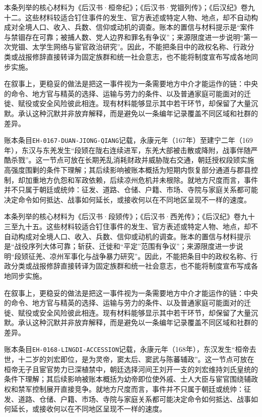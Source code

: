本条列举的核心材料为《后汉书·桓帝纪》；《后汉书·党锢列传》；《后汉纪》卷九十二。这些材料较适合钉住事件的发生、官方表述或特定人物、地点，却不自动构成对全境人口、收入、兵数、信仰或动机的调查。账本的置信与材料提示是“案件与禁锢存在可靠；被捕人数、党人边界和罪名有争议”；来源限度进一步说明“第一次党锢、太学生网络与宦官政治研究”。因此，不能把条目中的政权名称、行政分类或战报修辞直接转译为固定族群和统一社会意志，也不能将制度宣布写成各地同步实施。

在叙事上，更稳妥的做法是把这一事件视为一条需要地方中介才能运作的链：中央的命令、地方官与精英的选择、运输与劳力的条件、以及普通家庭可能面对的迁徙、赋役或安全风险彼此相连。现有材料能够显示其中若干环节，却保留了大量沉默。承认这种沉默并非放弃解释，而是避免以一条编年记录覆盖不同区域和社群的差异。

账本条目\texttt{EH-0167-DUAN-JIONG-QIANG}记载，永康元年（167年）至建宁二年（169年），东汉与东羌发生“段颎在陇右连续进军，东羌大部被击散或降附，战事伴随严酷杀戮”。这一节点可放在长期羌乱消耗财政并威胁陇右交通，朝廷授权段颎实施高强度围剿的条件下理解；其后续影响被账本概括为短期内恢复部分通道与郡县控制，却加重地方仇怨和军政依赖，后续凉州危机并未根除。就地方尺度而言，事件并不只属于朝廷或统帅：征发、道路、仓储、户籍、市场、寺院与家庭关系都可能决定命令如何抵达、战事如何延长，或接收何以在不同地区呈现不一样的速度。

本条列举的核心材料为《后汉书·段颎传》；《后汉书·西羌传》；《后汉纪》卷九十三至九十五。这些材料较适合钉住事件的发生、官方表述或特定人物、地点，却不自动构成对全境人口、收入、兵数、信仰或动机的调查。账本的置信与材料提示是“战役序列大体可靠；斩获、迁徙和“平定”范围有争议”；来源限度进一步说明“段颎征羌、凉州军事化与战争暴力研究”。因此，不能把条目中的政权名称、行政分类或战报修辞直接转译为固定族群和统一社会意志，也不能将制度宣布写成各地同步实施。

在叙事上，更稳妥的做法是把这一事件视为一条需要地方中介才能运作的链：中央的命令、地方官与精英的选择、运输与劳力的条件、以及普通家庭可能面对的迁徙、赋役或安全风险彼此相连。现有材料能够显示其中若干环节，却保留了大量沉默。承认这种沉默并非放弃解释，而是避免以一条编年记录覆盖不同区域和社群的差异。

账本条目\texttt{EH-0168-LINGDI-ACCESSION}记载，永康元年（168年），东汉发生“桓帝去世，十二岁的刘宏即位，是为灵帝，窦太后、窦武与陈蕃辅政”。这一节点可放在桓帝无子且宦官势力已深植禁中，朝廷选择河间王刘开一支的刘宏维持刘氏皇统的条件下理解；其后续影响被账本概括为幼帝即位使外戚、士人大臣与宦官围绕辅政权和禁军控制展开直接竞争。就地方尺度而言，事件并不只属于朝廷或统帅：征发、道路、仓储、户籍、市场、寺院与家庭关系都可能决定命令如何抵达、战事如何延长，或接收何以在不同地区呈现不一样的速度。

